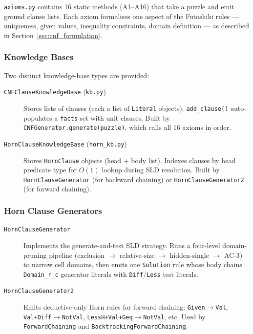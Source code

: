 \texttt{axioms.py} contains 16 static methods (A1–A16) that take a puzzle
and emit ground clause lists.
Each axiom formalises one aspect of the Futoshiki rules — uniqueness, given
values, inequality constraints, domain definition — as described in
Section~\ref{sec:cnf_formulation}.

\subsubsection{Knowledge Bases}

Two distinct knowledge-base types are provided:

\begin{description}
  \item[\texttt{CNFClauseKnowledgeBase} (\texttt{kb.py})]
    Stores lists of clauses (each a list of \texttt{Literal} objects).
    \texttt{add\_clause()} auto-populates a \texttt{facts} set with unit
    clauses.
    Built by \texttt{CNFGenerator.generate(puzzle)}, which calls all 16 axioms
    in order.

  \item[\texttt{HornClauseKnowledgeBase} (\texttt{horn\_kb.py})]
    Stores \texttt{HornClause} objects (head + body list).
    Indexes clauses by head predicate type for $O(1)$ lookup during SLD
    resolution.
    Built by \texttt{HornClauseGenerator} (for backward chaining) or
    \texttt{HornClauseGenerator2} (for forward chaining).
\end{description}

\subsubsection{Horn Clause Generators}

\begin{description}
  \item[\texttt{HornClauseGenerator}] Implements the generate-and-test SLD
    strategy.
    Runs a four-level domain-pruning pipeline
    (exclusion $\to$ relative-size $\to$ hidden-single $\to$ AC-3)
    to narrow cell domains, then emits one \texttt{Solution} rule whose body
    chains \texttt{Domain\_r\_c} generator literals with \texttt{Diff}/\texttt{Less}
    test literals.

  \item[\texttt{HornClauseGenerator2}] Emits deductive-only Horn rules for
    forward chaining: \texttt{Given$\to$Val}, \texttt{Val+Diff$\to$NotVal},
    \texttt{LessH+Val+Geq$\to$NotVal}, etc.
    Used by \texttt{ForwardChaining} and \texttt{BacktrackingForwardChaining}.
\end{description}

